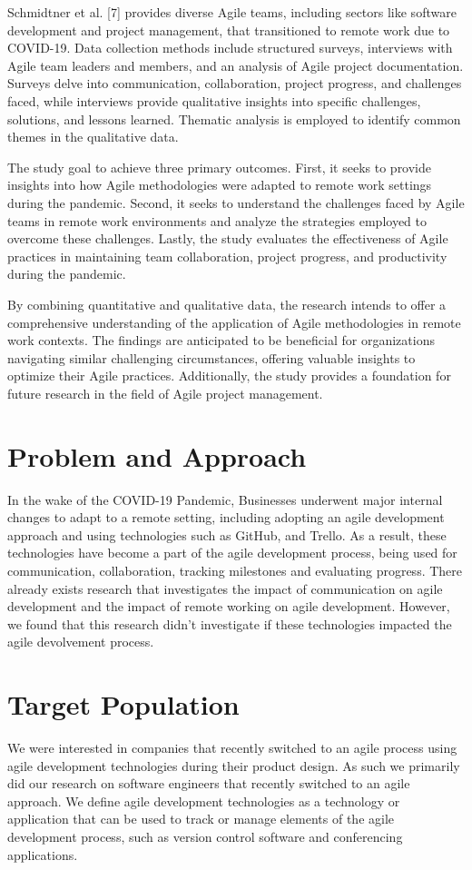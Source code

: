 \documentclass[conference]{IEEEtran}
\begin{document}
Schmidtner et al. [7] provides diverse Agile teams, including sectors like software development and project management, that transitioned to remote work due to COVID-19. Data collection methods include structured surveys, interviews with Agile team leaders and members, and an analysis of Agile project documentation. Surveys delve into communication, collaboration, project progress, and challenges faced, while interviews provide qualitative insights into specific challenges, solutions, and lessons learned. Thematic analysis is employed to identify common themes in the qualitative data.

The study goal to achieve three primary outcomes. First, it seeks to provide insights into how Agile methodologies were adapted to remote work settings during the pandemic. Second, it seeks to understand the challenges faced by Agile teams in remote work environments and analyze the strategies employed to overcome these challenges. Lastly, the study evaluates the effectiveness of Agile practices in maintaining team collaboration, project progress, and productivity during the pandemic.

By combining quantitative and qualitative data, the research intends to offer a comprehensive understanding of the application of Agile methodologies in remote work contexts. The findings are anticipated to be beneficial for organizations navigating similar challenging circumstances, offering valuable insights to optimize their Agile practices. Additionally, the study provides a foundation for future research in the field of Agile project management.

\section{Problem and Approach}
In the wake of the COVID-19 Pandemic, Businesses underwent major internal changes to adapt to a remote setting, including adopting an agile development approach and using technologies such as GitHub, and Trello. As a result, these technologies have become a part of the agile development process, being used for communication, collaboration, tracking milestones and evaluating progress.  There already exists research that investigates the impact of communication on agile development and the impact of remote working on agile development. However, we found that this research didn’t investigate if these technologies impacted the agile devolvement process.

\section{Target Population}
We were interested in companies that recently switched to an agile process using agile development technologies during their product design. As such we primarily did our research on software engineers that recently switched to an agile approach. We define agile development technologies as a technology or application that can be used to track or manage elements of the agile development process, such as version control software and conferencing applications. 
\end{document}
